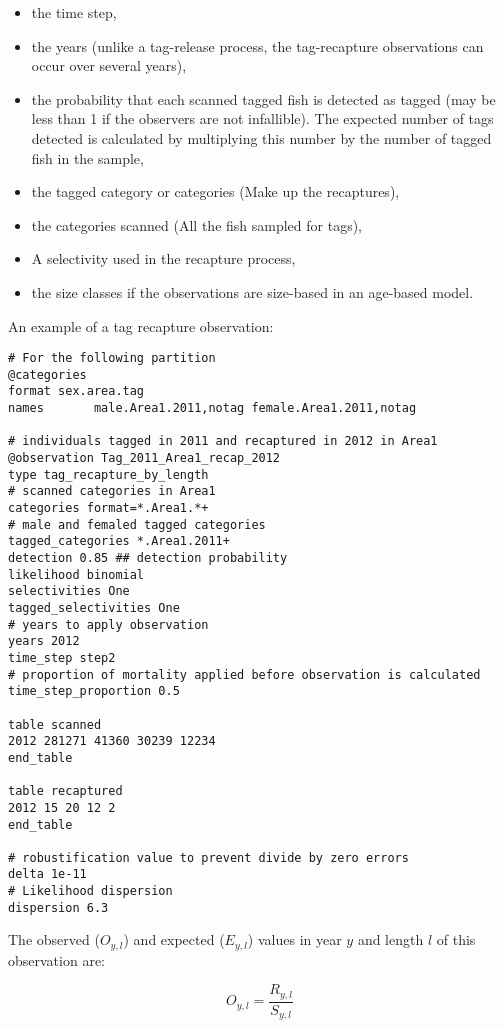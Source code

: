 \begin{itemize}
	\item the time step,
	\item the years (unlike a tag-release process, the tag-recapture observations can occur over several years),
	\item the probability that each scanned tagged fish is detected as tagged (may be less than 1 if the observers are not infallible). The expected number of tags detected is calculated by multiplying this number by the number of tagged fish in the sample,
	\item the tagged category or categories (Make up the recaptures),
	\item the categories scanned (All the fish sampled for tags),
	\item A selectivity used in the recapture process,
	\item the size classes if the observations are size-based in an age-based model.
\end{itemize}


An example of a tag recapture observation:

{\small{\begin{verbatim}
# For the following partition
@categories
format sex.area.tag
names  		male.Area1.2011,notag female.Area1.2011,notag

# individuals tagged in 2011 and recaptured in 2012 in Area1
@observation Tag_2011_Area1_recap_2012
type tag_recapture_by_length
# scanned categories in Area1
categories format=*.Area1.*+
# male and femaled tagged categories
tagged_categories *.Area1.2011+
detection 0.85 ## detection probability
likelihood binomial
selectivities One
tagged_selectivities One
# years to apply observation
years 2012
time_step step2
# proportion of mortality applied before observation is calculated
time_step_proportion 0.5

table scanned
2012 281271 41360 30239 12234
end_table

table recaptured
2012 15 20 12 2
end_table

# robustification value to prevent divide by zero errors
delta 1e-11
# Likelihood dispersion
dispersion 6.3
\end{verbatim}}}

The observed ($O_{y,l}$) and expected ($E_{y,l}$) values in year $y$ and length $l$ of this observation are:

\begin{equation}
O_{y,l} = \frac{R_{y,l}}{S_{y,l}}
\end{equation}


